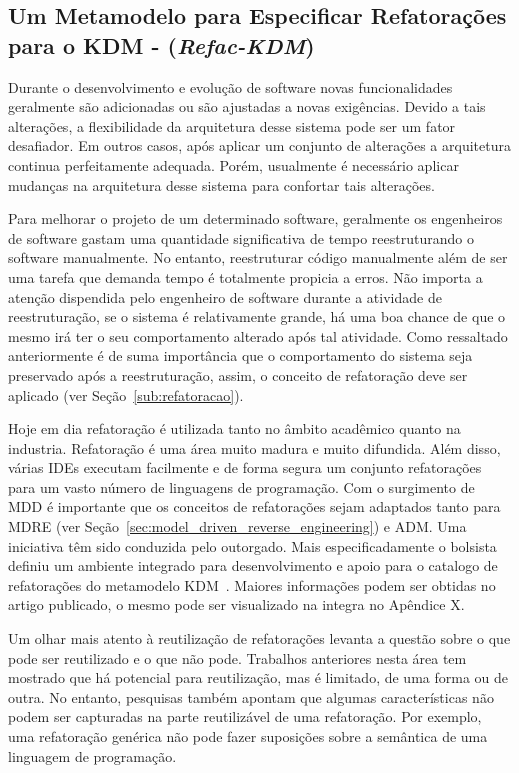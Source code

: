 \subsection{Um Metamodelo para Especificar Refatorações para o KDM - (\textit{Refac-KDM})}

Durante o desenvolvimento e evolução de software novas funcionalidades geralmente são adicionadas ou são ajustadas a novas exigências. Devido a tais alterações, a flexibilidade da arquitetura desse sistema pode ser um fator desafiador. Em outros casos, após aplicar um conjunto de alterações a arquitetura continua perfeitamente adequada. Porém, usualmente é necessário aplicar mudanças na arquitetura desse sistema para confortar tais alterações. 

Para melhorar o projeto de um determinado software, geralmente os engenheiros de software gastam uma quantidade significativa de tempo reestruturando o software manualmente. No entanto, reestruturar código manualmente além de ser uma tarefa que demanda tempo é totalmente propicia a erros. Não importa a atenção dispendida pelo engenheiro de software durante a atividade de reestruturação, se o sistema é relativamente grande, há uma boa chance de que o mesmo irá ter o seu comportamento alterado após tal atividade. Como ressaltado anteriormente é de suma importância que o comportamento do sistema seja preservado após a reestruturação, assim, o conceito de refatoração deve ser aplicado (ver Seção~\ref{sub:refatoracao}).

 Hoje em dia refatoração é utilizada tanto no âmbito acadêmico quanto na industria. Refatoração é uma área muito madura e muito difundida. Além disso, várias IDEs executam facilmente e de forma segura um conjunto refatorações para um vasto número de linguagens de programação. Com o surgimento de MDD é importante que os conceitos de refatorações sejam adaptados tanto para MDRE (ver Seção~\ref{sec:model_driven_reverse_engineering}) e ADM. Uma iniciativa têm sido conduzida pelo outorgado. Mais especificadamente o bolsista definiu um ambiente integrado para desenvolvimento e apoio para o catalogo de refatorações do metamodelo KDM~\citep{KDM_RE_A_Model_Driven_Refactoring_Tool_for_KDM}. Maiores informações podem ser obtidas no artigo publicado, o mesmo pode ser visualizado na integra no Apêndice X.

Um olhar mais atento à reutilização de refatorações levanta a questão sobre o que pode ser reutilizado e o que não pode. Trabalhos anteriores nesta área tem mostrado que há potencial para reutilização, mas é limitado, de uma forma ou de outra. No entanto, pesquisas também apontam que algumas características não podem ser capturadas na parte reutilizável de uma refatoração. Por exemplo, uma refatoração genérica não pode fazer suposições sobre a semântica de uma linguagem de programação. 

